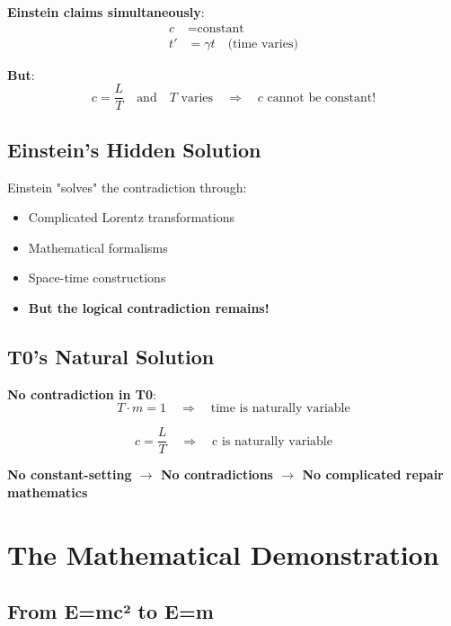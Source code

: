 \documentclass[12pt,a4paper]{article}
\newcommand{\Tfield}{T}
\begin{document}
	\textbf{Einstein claims simultaneously}:
	\begin{align}
		c &= \text{constant} \\
		t' &= \gamma t \quad \text{(time varies)}
	\end{align}
	
	\textbf{But}:
	\begin{equation}
		c = \frac{L}{T} \quad \text{and} \quad T \text{ varies} \quad \Rightarrow \quad c \text{ cannot be constant!}
	\end{equation}
	
	\subsection{Einstein's Hidden Solution}
	
	Einstein "solves" the contradiction through:
	\begin{itemize}
		\item Complicated Lorentz transformations
		\item Mathematical formalisms
		\item Space-time constructions
		\item \textbf{But the logical contradiction remains!}
	\end{itemize}
	
	\subsection{T0's Natural Solution}
	
	\textbf{No contradiction in T0}:
	\begin{equation}
		\Tfield \cdot m = 1 \quad \Rightarrow \quad \text{time is naturally variable}
	\end{equation}
	
	\begin{equation}
		c = \frac{L}{T} \quad \Rightarrow \quad \text{c is naturally variable}
	\end{equation}
	
	\textbf{No constant-setting $\rightarrow$ No contradictions $\rightarrow$ No complicated repair mathematics}
	
	\section{The Mathematical Demonstration}
	
	\subsection{From E=mc² to E=m}
	
\end{document}
